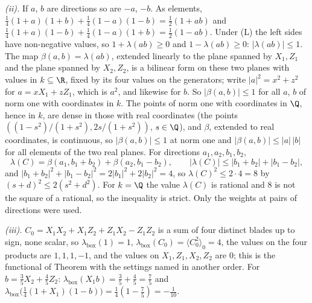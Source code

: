 \emph{(ii).} If $a$, $b$ are directions so are $-a$, $-b$. As elements, $\tfrac14(1 + a)(1 + b) + \tfrac14(1 - a)(1 - b) = \tfrac12(1 + ab)$ and $\tfrac14(1 + a)(1 - b) + \tfrac14(1 - a)(1 + b) = \tfrac12(1 - ab)$. Under (L) the left sides have non-negative values, so $1 + \lambda(ab) \ge 0$ and $1 - \lambda(ab) \ge 0$: $|\lambda(ab)| \le 1$. The map $\beta(a, b) = \lambda(ab)$, extended linearly to the plane spanned by $X_{1}, Z_{1}$ and the plane spanned by $X_{2}, Z_{2}$, is a bilinear form on these two planes with values in $k \subseteq \R$, fixed by its four values on the generators; write $|a|^{2} = x^{2} + z^{2}$ for $a = xX_{1} + zZ_{1}$, which is $a^{2}$, and likewise for $b$. So $|\beta(a, b)| \le 1$ for all $a$, $b$ of norm one with coordinates in $k$. The points of norm one with coordinates in $\Q$, hence in $k$, are dense in those with real coordinates (the points $((1 - s^{2})/(1 + s^{2}), 2s/(1 + s^{2}))$, $s \in \Q$), and $\beta$, extended to real coordinates, is continuous, so $|\beta(a, b)| \le 1$ at norm one and $|\beta(a, b)| \le |a|\,|b|$ for all elements of the two real planes. For directions $a_{1}, a_{2}, b_{1}, b_{2}$,
\[
\lambda(C) = \beta(a_{1}, b_{1} + b_{2}) + \beta(a_{2}, b_{1} - b_{2}), \qquad |\lambda(C)| \le |b_{1} + b_{2}| + |b_{1} - b_{2}| ,
\]
and $|b_{1} + b_{2}|^{2} + |b_{1} - b_{2}|^{2} = 2|b_{1}|^{2} + 2|b_{2}|^{2} = 4$, so $\lambda(C)^{2} \le 2 \cdot 4 = 8$ by $(s + d)^{2} \le 2(s^{2} + d^{2})$. For $k = \Q$ the value $\lambda(C)$ is rational and $8$ is not the square of a rational, so the inequality is strict. Only the weights at pairs of directions were used.

\emph{(iii).} $C_{0} = X_{1}X_{2} + X_{1}Z_{2} + Z_{1}X_{2} - Z_{1}Z_{2}$ is a sum of four distinct blades up to sign, none scalar, so $\lambda_{\mathrm{box}}(1) = 1$, $\lambda_{\mathrm{box}}(C_{0}) = \langle C_{0}^{2}\rangle_{0} = 4$, the values on the four products are $1, 1, 1, -1$, and the values on $X_{1}, Z_{1}, X_{2}, Z_{2}$ are $0$; this is the functional of Theorem  with the settings named in another order. For $b = \tfrac35X_{2} + \tfrac45Z_{2}$: $\lambda_{\mathrm{box}}(X_{1}b) = \tfrac35 + \tfrac45 = \tfrac75$ and $\lambda_{\mathrm{box}}\bigl(\tfrac14(1 + X_{1})(1 - b)\bigr) = \tfrac14(1 - \tfrac75) = -\tfrac{1}{10}$.

